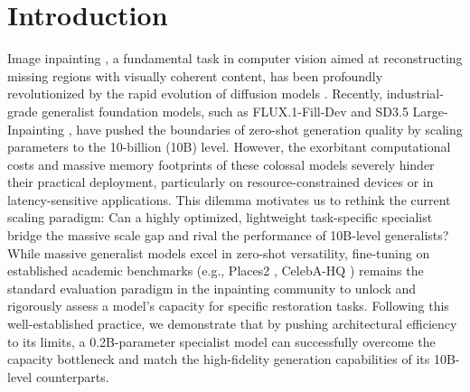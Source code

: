 \documentclass{llmxive}
\begin{document}
\section{Introduction}\label{sec:intro}
\vspace{-0.5em}
Image inpainting \cite{Bertalmio2000imageinpaint}, a fundamental task in computer vision aimed at reconstructing missing regions with visually coherent content, has been profoundly revolutionized by the rapid evolution of diffusion models \cite{xu2025pixelhacker,Rombach2022LDM,flux2024}. Recently, industrial-grade generalist foundation models, such as FLUX.1-Fill-Dev \cite{flux2024} and SD3.5 Large-Inpainting \cite{esser2024SD3}, have pushed the boundaries of zero-shot generation quality by scaling parameters to the 10-billion (10B) level. However, the exorbitant computational costs and massive memory footprints of these colossal models severely hinder their practical deployment, particularly on resource-constrained devices or in latency-sensitive applications. This dilemma motivates us to rethink the current scaling paradigm: Can a highly optimized, lightweight task-specific specialist bridge the massive scale gap and rival the performance of 10B-level generalists? While massive generalist models excel in zero-shot versatility, fine-tuning on established academic benchmarks (e.g., Places2 \cite{zhou2017places}, CelebA-HQ \cite{karras2018celebahq}) remains the standard evaluation paradigm in the inpainting community \cite{suvorov2021lama, li2022mat} to unlock and rigorously assess a model's capacity for specific restoration tasks. Following this well-established practice, we demonstrate that by pushing architectural efficiency to its limits, a 0.2B-parameter specialist model can successfully overcome the capacity bottleneck and match the high-fidelity generation capabilities of its 10B-level counterparts.
\end{document}
